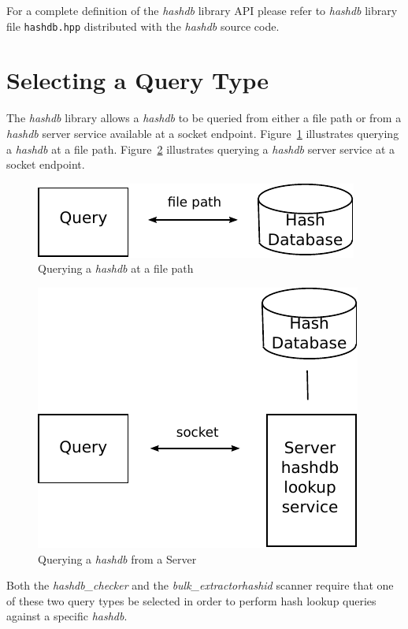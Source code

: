 \documentclass[11pt,twoside]{article}
\newcommand \bulk {\textit{bulk\_extractor}\xspace}
\newcommand \hdb {\textit{hashdb}\xspace}
\newcommand \hdbc {\textit{hashdb\_checker}\xspace}
\newcommand \hid {\textit{hashid}\xspace}
\begin{document}
For a complete definition of the \hdb library API
please refer to \hdb library file \texttt{hashdb.hpp}
distributed with the \hdb source code.

\section{Selecting a Query Type}
The \hdb library allows a \hdb to be queried
from either a file path
or from a \hdb server service available at a socket endpoint.
Figure~\ref{fig:query_path} illustrates querying a \hdb at a file path.
Figure~\ref{fig:query_socket} illustrates querying a \hdb server service
at a socket endpoint.
\begin{figure}[h]
	\center
	\includegraphics[scale=1.0]{drawings/query_path.pdf}
	\caption{Querying a \hdb at a file path}
	\label{fig:query_path}
\end{figure}
\begin{figure}[h]
	\center
	\includegraphics[scale=1.0]{drawings/query_socket.pdf}
	\caption{Querying a \hdb from a Server}
	\label{fig:query_socket}
\end{figure}

Both the \hdbc and the \bulk \hid scanner require that one of these two
query types be selected in order to perform hash lookup queries
against a specific \hdb.
\end{document}
